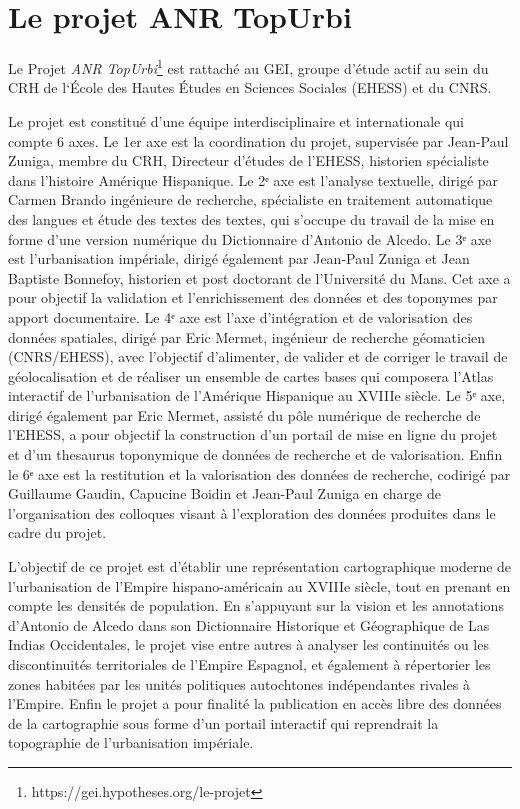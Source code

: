 \documentclass[a4paper,12pt,twoside]{book}
\begin{document}
\section{Le projet ANR TopUrbi}

Le Projet \textit{ANR TopUrbi}\footnote{https://gei.hypotheses.org/le-projet} est rattaché au \Gls{GEI}, groupe d’étude actif au sein du \Gls{CRH} de l‘École des Hautes Études en Sciences Sociales (\Gls{EHESS}) et du CNRS.

Le projet est constitué d’une équipe interdisciplinaire et internationale qui compte 6 axes. Le 1er axe est la coordination du projet, supervisée par Jean-Paul Zuniga, membre du \Gls{CRH}, Directeur d’études de l’\Gls{EHESS}, historien spécialiste dans l’histoire Amérique Hispanique. Le 2ᵉ axe est  l’analyse textuelle, dirigé par Carmen Brando ingénieure de recherche, spécialiste en traitement automatique des langues et étude des textes des textes, qui s’occupe du travail de la mise en forme d’une version numérique du Dictionnaire d’Antonio de Alcedo. Le 3ᵉ axe est l’urbanisation impériale, dirigé également par Jean-Paul Zuniga et Jean Baptiste Bonnefoy, historien et post doctorant de l’Université du Mans. Cet axe a pour objectif la validation et l’enrichissement des données et des toponymes par apport documentaire. Le 4ᵉ axe est l’axe d’intégration et de valorisation des données spatiales, dirigé par Eric Mermet, ingénieur de recherche géomaticien (CNRS/EHESS), avec l’objectif d’alimenter, de valider et de corriger le travail de géolocalisation et de réaliser un ensemble de cartes bases qui composera l’Atlas interactif de l’urbanisation de l’Amérique Hispanique au XVIIIe siècle. Le 5ᵉ axe, dirigé également par Eric Mermet, assisté du pôle numérique de recherche de l’EHESS, a pour objectif la construction d’un portail de mise en ligne du projet et d’un thesaurus toponymique de données de recherche et de valorisation. Enfin le 6ᵉ axe est la restitution et la valorisation des données de recherche, codirigé par Guillaume Gaudin, Capucine Boidin et Jean-Paul Zuniga en charge de l’organisation des colloques visant à l’exploration des données produites dans le cadre du projet.

L’objectif de ce projet est d’établir une représentation cartographique moderne de l’urbanisation de l’Empire hispano-américain au XVIIIe siècle, tout en prenant en compte les densités de population. En s’appuyant sur la vision et les annotations d’Antonio de Alcedo dans son Dictionnaire Historique et Géographique de Las Indias Occidentales, le projet vise entre autres à analyser les continuités ou les discontinuités territoriales de l’Empire Espagnol, et également à répertorier les zones habitées par les unités politiques autochtones indépendantes rivales à l’Empire. Enfin le projet a pour finalité la publication en accès libre des données de la cartographie sous forme d’un portail interactif qui reprendrait la topographie de l’urbanisation impériale.  
\end{document}
